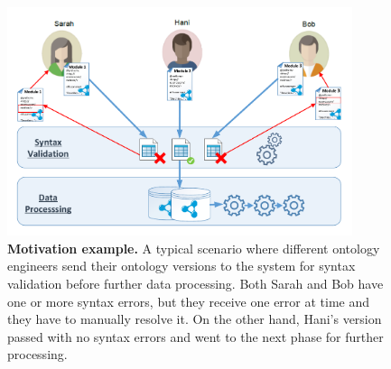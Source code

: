 	\begin{figure}[ht]
			\includegraphics[width=0.9\textwidth]{images/motivation.pdf}
			\caption{\textbf{Motivation example.} A typical scenario where different ontology engineers send their ontology versions to the system for syntax validation before further data processing.
			Both Sarah and Bob have one or more syntax errors, but they receive one error at time and they have to manually resolve it.
			On the other hand,  Hani's version passed with no syntax errors and went to the next phase for further processing.}
			\label{Fig:Motivation}
	\end{figure}



